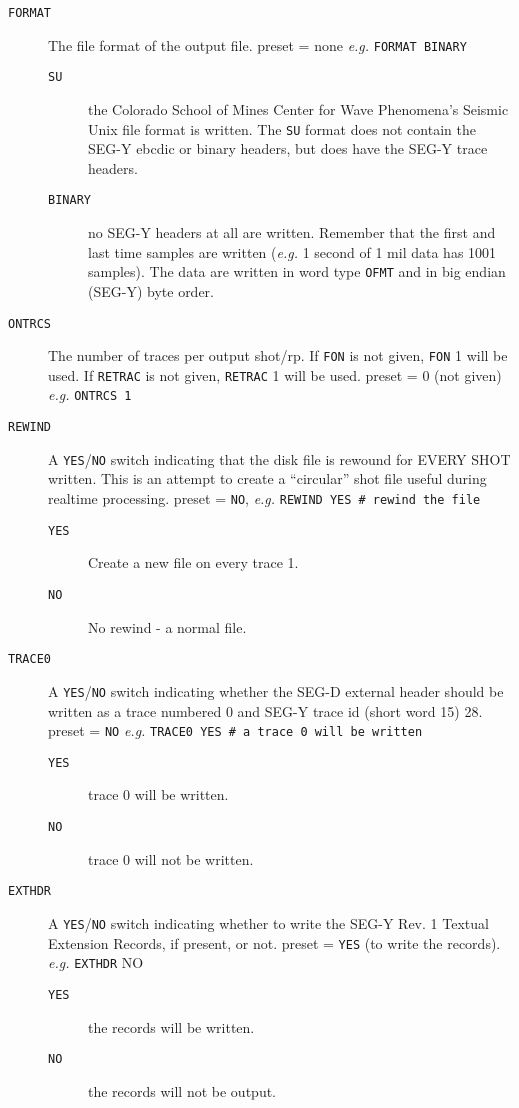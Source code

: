 \begin{description}
\item[\texttt{FORMAT}]  The file format of the output file.  \Gls{preset} = none      \textit{e.g.} \texttt{FORMAT BINARY}
\begin{description}
\item[\texttt{SU}]  the Colorado School of Mines Center for Wave Phenomena's Seismic Unix file format is written.  The \texttt{SU} format does not contain the SEG-Y \gls{ebcdic} or binary headers, but does have the SEG-Y trace headers.
\item[\texttt{BINARY}]  no SEG-Y headers at all are written.  Remember that the first and last time samples are written (\textit{e.g.} 1 second of 1 mil data has 1001 samples).  The data are written in word type \texttt{OFMT} and in big endian (SEG-Y) byte order.
\end{description}

\item[\texttt{ONTRCS}]  The number of traces per output \gls{shot}/\gls{rp}.  If \texttt{FON} is not given, \texttt{FON} 1 will be used.  If \texttt{RETRAC} is not given, \texttt{RETRAC} 1 will be used.  \Gls{preset} = 0 (not given)  \textit{e.g.}  \texttt{ONTRCS 1}

\item[\texttt{REWIND}]  A \texttt{YES}/\texttt{NO} switch indicating that the disk file is rewound for EVERY SHOT written.  This is an attempt to create a ``circular'' \gls{shot} file useful during realtime processing.  \Gls{preset} = \texttt{NO},      \textit{e.g.}  \texttt{REWIND YES    \# rewind the file}
\begin{description}
\item[\texttt{YES}]   Create a new file on every trace 1.
\item[\texttt{NO}]  No rewind - a normal file.
\end{description}

\item[\texttt{TRACE0}]  A \texttt{YES}/\texttt{NO} switch indicating whether the SEG-D external header should be written as a trace numbered 0 and SEG-Y trace id (short word 15) 28.  \Gls{preset} = \texttt{NO}    \textit{e.g.}    \texttt{TRACE0 YES   \# a trace 0 will be written}
\begin{description}
\item[\texttt{YES}]  trace 0 will be written.
\item[\texttt{NO}]  trace 0 will not be written.
\end{description}

\item[\texttt{EXTHDR}]  A \texttt{YES}/\texttt{NO} switch indicating whether to write the SEG-Y Rev. 1 Textual Extension Records, if present, or not.  \Gls{preset} = \texttt{YES} (to write the records).    \textit{e.g.}  \texttt{EXTHDR} NO
\begin{description}
\item[\texttt{YES}]  the records will be written.
\item[\texttt{NO}]  the records will not be output.
\end{description}


\end{description}
